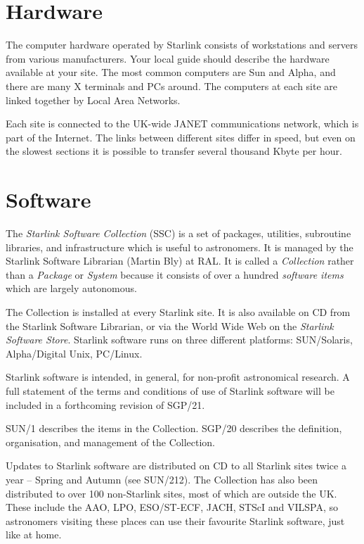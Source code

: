 \documentclass[twoside]{article}
\newcommand{\htmladdnormallink}[2]{#1}
\newcommand{\xref}[3]{#1}
\begin{document}
\newpage

\section{Hardware}

The computer hardware operated by Starlink consists of workstations and
servers from various manufacturers.
Your local guide should describe the hardware available at your site.
The most common computers are Sun and Alpha, and there are many X terminals
and PCs around.
The computers at each site are linked together by Local Area Networks.

Each site is connected to the UK-wide JANET communications network, which is
part of the Internet.
The links between different sites differ in speed, but even on the slowest
sections it is possible to transfer several thousand Kbyte per hour.

\newpage

\section{Software}

The {\em Starlink Software Collection}\/ (SSC) is a set of packages, utilities,
subroutine libraries, and infrastructure which is useful to astronomers.
It is managed by the Starlink Software Librarian (Martin Bly) at RAL.
It is called a {\em Collection}\/ rather than a {\em Package}\/ or
{\em System}\/ because it consists of over a hundred {\em software items}\/
which are largely autonomous.

The Collection is installed at every Starlink site.
It is also available on CD from the Starlink Software Librarian, or via
the World Wide Web on the
{\em \htmladdnormallink{Starlink Software Store}
{http://star-www.rl.ac.uk/cgi-store/storetop}}.
Starlink software runs on three different platforms: SUN/Solaris,
Alpha/Digital Unix, PC/Linux.

Starlink software is intended, in general, for non-profit astronomical research.
A full statement of the terms and conditions of use of Starlink software
will be included in a forthcoming revision of SGP/21.

\xref{SUN/1}{sun1}{} describes the items in the Collection.
\xref{SGP/20}{sgp20}{} describes the definition, organisation, and management
of the Collection.

Updates to Starlink software are distributed on CD to all Starlink sites
twice a year -- Spring and Autumn (see \xref{SUN/212}{sun212}{}).
The Collection has also been distributed to over 100 non-Starlink sites, most of
which are outside the UK.
These include the AAO, LPO, ESO/ST-ECF, JACH, STScI and VILSPA, so astronomers
visiting these places can use their favourite Starlink software, just like at
home.
\end{document}
